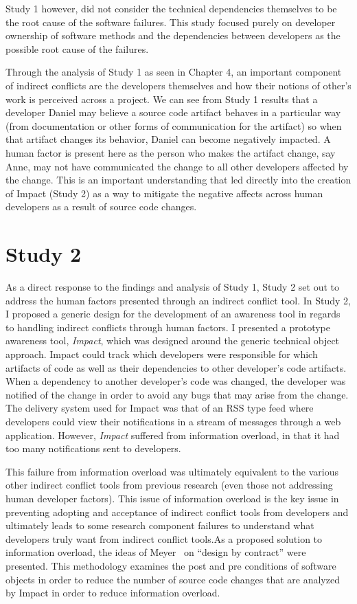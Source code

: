 Study 1 however, did not consider the technical dependencies themselves to be the root cause of
the software failures. This study focused purely on developer ownership of software methods and
the dependencies between developers as the possible root cause of the failures.

Through the analysis of Study 1 as seen in Chapter 4, an important component of indirect conflicts are the developers
themselves and how their notions of other's work is perceived across a project. We can see from Study 1 results that
a developer Daniel may believe a source code artifact behaves in a particular way (from documentation or other forms
of communication for the artifact) so when that artifact changes its behavior, Daniel can become negatively impacted.
A human factor is present here as the person who makes the artifact change, say Anne, may not have communicated the
change to all other developers affected by the change. This is an important understanding that led directly into the
creation of Impact (Study 2) as a way to mitigate the negative affects across human developers as a result of 
source code changes.

\section{Study 2}

As a direct response to the findings and analysis of Study 1, Study 2 set out to address the human factors presented
through an indirect conflict tool. In Study 2, I proposed a generic design for the development of an awareness tool 
in regards to handling indirect conflicts through human factors. I presented a prototype awareness tool, \textit{Impact}, 
which was designed around the generic technical object approach. Impact could track which developers were responsible
for which artifacts of code as well as their dependencies to other developer's code artifacts. When a dependency to
another developer's code was changed, the developer was notified of the change in order to avoid any bugs that
may arise from the change. The delivery system used for Impact was that of an RSS type feed where developers could view
their notifications in a stream of messages through a web application. However, \textit{Impact} suffered from information 
overload, in that it had too many notifications sent to developers.

This failure from information overload was ultimately equivalent to the various other indirect conflict tools from
previous research (even those not addressing human developer factors). This issue of information overload is the key issue 
in preventing adopting and acceptance of indirect conflict tools from developers and ultimately leads to some research
component failures to understand what developers truly want from indirect conflict tools.As a proposed solution to information overload, 
the ideas of Meyer~\cite{Meyer:1988} on ``design by contract'' were presented. This methodology examines the 
post and pre conditions of software objects in order to reduce the number of source code changes that are analyzed by 
Impact in order to reduce information overload.

